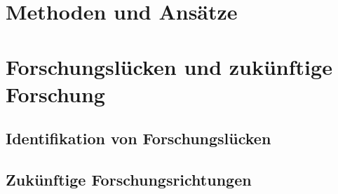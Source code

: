 
\section{Methoden und Ansätze}


\section{Forschungslücken und zukünftige Forschung}


\subsection{Identifikation von Forschungslücken}


\subsection{Zukünftige Forschungsrichtungen}

